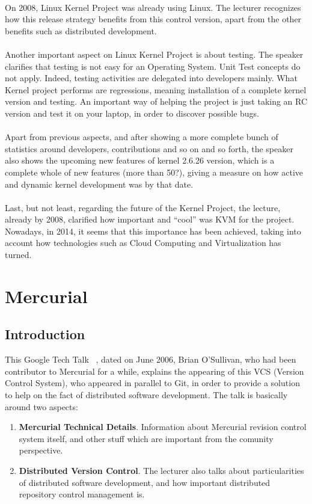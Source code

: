 \documentclass[11pt]{article}
\begin{document}
\\
On 2008, Linux Kernel Project was already using Linux. The lecturer recognizes how this release strategy benefits from this control version, apart from the other benefits such as distributed development.\\
\\
Another important aspect on Linux Kernel Project is about testing. The speaker clarifies that testing is not easy for an Operating System. Unit Test concepts do not apply. Indeed, testing activities are delegated into developers mainly. What Kernel project performs are regressions, meaning installation of a complete kernel version and testing. An important way of helping the project is just taking an RC version and test it on your laptop, in order to discover possible bugs.\\
\\
Apart from previous aspects, and after showing a more complete bunch of statistics around developers, contributions and so on and so forth, the speaker also shows the upcoming new features of kernel 2.6.26 version, which is a complete whole of new features (more than 50?), giving a measure on how active and dynamic kernel development was by that date.\\
\\
Last, but not least, regarding the future of the Kernel Project, the lecture, already by 2008, clarified how important and ``cool'' was KVM for the project. Nowadays, in 2014, it seems that this importance has been achieved, taking into account how technologies such as Cloud Computing and Virtualization has turned.

\pagebreak

\section{Mercurial}
\label{sec:mercurial}
\subsection{Introduction}
This Google Tech Talk ~\cite{TALK05}, dated on June 2006, Brian O'Sullivan, who had been contributor to Mercurial for a while, explains the appearing of this VCS (Version Control System), who appeared in parallel to Git, in order to provide a solution to help on the fact of distributed software development. The talk is basically around two aspects:
\begin{enumerate}
\item{\textbf{Mercurial Technical Details}}. Information about Mercurial revision control system itself, and other stuff which are important from the comunity perspective.
\item{\textbf{Distributed Version Control}}. The lecturer also talks about particularities of distributed software development, and how important distributed repository control management is.
\end{enumerate}
\end{document}
